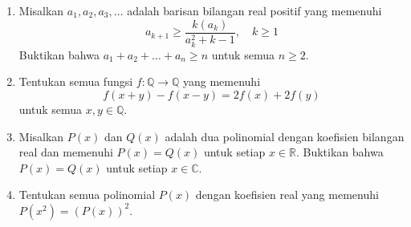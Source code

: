 \documentclass[12pt]{article}
\newcommand{\R}{\mathbb{R}}
\begin{document}
\begin{enumerate}
		\item
		Misalkan $a_1,a_2,a_3,\dots$ adalah barisan bilangan real positif yang memenuhi
		\[
		a_{k+1} \geq \dfrac{k(a_k)}{a^2_k+k-1} , \quad k \geq 1
		\]
		Buktikan bahwa $a_1 + a_2 + \dots + a_n \geq n$ untuk semua $n\geq 2$.
		
		\item
		Tentukan semua fungsi $f:\mathbb{Q} \rightarrow \mathbb{Q}$ yang memenuhi
		\[
		f(x+y)-f(x-y)=2f(x)+2f(y)
		\]
		untuk semua $x,y \in \mathbb{Q}$.
		
		\item
		Misalkan $P(x)$ dan $Q(x)$ adalah dua polinomial dengan koefisien bilangan real dan memenuhi $P(x)=Q(x)$ untuk setiap $x \in \R$. Buktikan bahwa $P(x)=Q(x)$ untuk setiap $x \in \mathbb{C}$.
		
		\item
		Tentukan semua polinomial $P(x)$ dengan koefisien real yang memenuhi $P(x^2)=(P(x))^2$.
		
	\end{enumerate}
	
	
\end{document}
